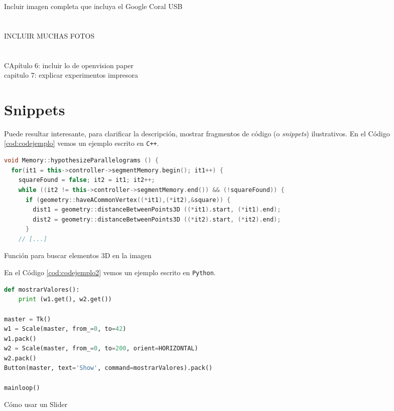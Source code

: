 Incluir imagen completa que incluya el Google Coral USB\\\\\\


INCLUIR MUCHAS FOTOS\\\\\\



CApítulo 6: incluir lo de openvision paper\\
capitulo 7: explicar experimentos impresora \\

\section{Snippets}

Puede resultar interesante, para clarificar la descripción, mostrar fragmentos de código (o \textit{snippets}) ilustrativos. En el Código \ref{cod:codejemplo} vemos un ejemplo escrito en \texttt{C++}.

\begin{code}[h]
\begin{lstlisting}[language=C++]
void Memory::hypothesizeParallelograms () {
  for(it1 = this->controller->segmentMemory.begin(); it1++) {
    squareFound = false; it2 = it1; it2++;
    while ((it2 != this->controller->segmentMemory.end()) && (!squareFound)) {
      if (geometry::haveACommonVertex((*it1),(*it2),&square)) {
        dist1 = geometry::distanceBetweenPoints3D ((*it1).start, (*it1).end);
        dist2 = geometry::distanceBetweenPoints3D ((*it2).start, (*it2).end);
      }
    // [...]
\end{lstlisting}
\caption[Función para buscar elementos 3D en la imagen]{Función para buscar elementos 3D en la imagen}
\label{cod:codejemplo}
\end{code}

En el Código \ref{cod:codejemplo2} vemos un ejemplo escrito en \texttt{Python}.

\begin{code}[h]
\begin{lstlisting}[language=Python]
def mostrarValores():
    print (w1.get(), w2.get())

master = Tk()
w1 = Scale(master, from_=0, to=42)
w1.pack()
w2 = Scale(master, from_=0, to=200, orient=HORIZONTAL)
w2.pack()
Button(master, text='Show', command=mostrarValores).pack()

mainloop()
\end{lstlisting}
\caption[Cómo usar un Slider]{Cómo usar un Slider}
\label{cod:codejemplo2}
\end{code}

